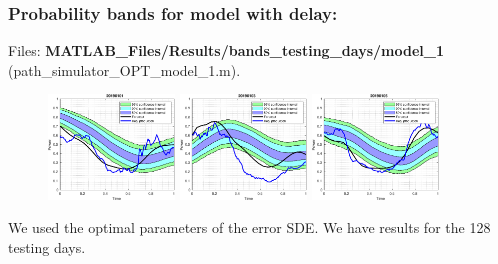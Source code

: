 \documentclass[aspectratio=169]{beamer}\usepackage[utf8]{inputenc}
\begin{document}
\begin{frame}\frametitle{Probability bands for model with delay:}
Files: \textbf{MATLAB\_Files/Results/bands\_testing\_days/model\_1} (path\_simulator\_OPT\_model\_1.m).

\begin{figure}[ht!]
\centering
\includegraphics[width=0.3\textwidth]{../../MATLAB_Files/Results/bands_testing_days/model_1/1.eps}
\includegraphics[width=0.3\textwidth]{../../MATLAB_Files/Results/bands_testing_days/model_1/2.eps}
\includegraphics[width=0.3\textwidth]{../../MATLAB_Files/Results/bands_testing_days/model_1/3.eps}
\end{figure}

We used the optimal parameters of the error SDE. We have results for the 128 testing days.

\end{frame}

\end{document}
